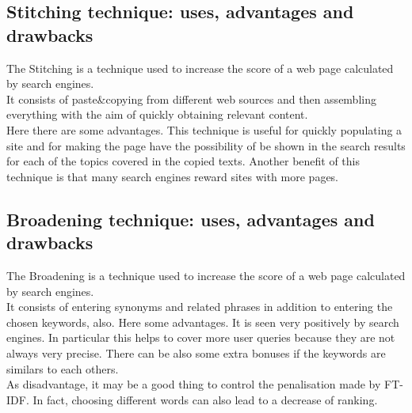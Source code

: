 \subsection{Stitching technique: uses, advantages and drawbacks}
The Stitching is a technique used to increase the score of a web page
calculated by search engines.\\ It consists of paste\&copying from
different web sources and then assembling everything with the aim
of quickly obtaining relevant content.\\
Here there are some advantages. This technique is useful for quickly
populating a site and for making the page have the possibility of be
shown in the search results for each of the topics covered in the copied
texts. Another benefit of this technique is that many search engines
reward sites with more pages.

\subsection{Broadening technique: uses, advantages and drawbacks}
The Broadening is a technique used to increase the score of a web page
calculated by search engines.\\
It consists of entering synonyms and related phrases in addition to
entering the chosen keywords, also.
Here some advantages. It is seen very
positively by search engines.
In particular this helps to cover more user queries because they are
not always very precise. There can be also some extra bonuses if the
keywords are similars to each others.\\
As disadvantage, it may be a good thing to control the penalisation made
by FT-IDF. In fact, choosing different words can also lead to a decrease of
ranking.

